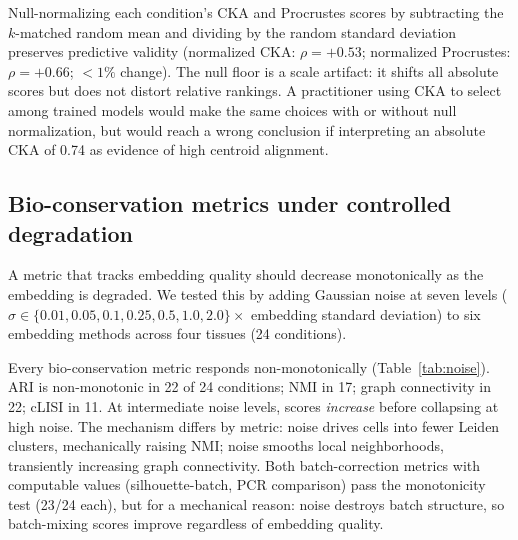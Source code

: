 \documentclass[11pt]{article}
\begin{document}
Null-normalizing each condition's CKA and Procrustes scores by
subtracting the $k$-matched random mean and dividing by the random
standard deviation preserves predictive validity (normalized CKA:
$\rho = +0.53$; normalized Procrustes: $\rho = +0.66$;
$< 1\%$ change). The null floor is a scale artifact: it shifts all
absolute scores but does not distort relative rankings. A practitioner
using CKA to select among trained models would make the same choices
with or without null normalization, but would reach a wrong conclusion
if interpreting an absolute CKA of 0.74 as evidence of high
centroid alignment.


\subsection{Bio-conservation metrics under controlled degradation}
\label{sec:noise}

A metric that tracks embedding quality should decrease monotonically
as the embedding is degraded. We tested this by adding Gaussian noise at
seven levels ($\sigma \in \{0.01, 0.05, 0.1, 0.25, 0.5, 1.0, 2.0\}
\times$ embedding standard deviation) to six embedding methods across
four tissues (24 conditions).

Every bio-conservation metric responds non-monotonically
(Table~\ref{tab:noise}). ARI is non-monotonic in 22 of 24 conditions;
NMI in 17; graph connectivity in 22; cLISI in 11. At intermediate noise
levels, scores \emph{increase} before collapsing at high noise. The
mechanism differs by metric: noise drives cells into fewer Leiden
clusters, mechanically raising NMI; noise smooths local neighborhoods,
transiently increasing graph connectivity. Both batch-correction metrics
with computable values (silhouette-batch, PCR comparison) pass the
monotonicity test (23/24 each), but for a mechanical reason: noise
destroys batch structure, so batch-mixing scores improve regardless of
embedding quality.
\end{document}
